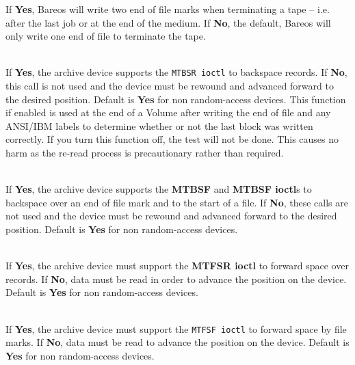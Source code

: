\begin{description}
If {\bf Yes}, Bareos will write two end of file marks when terminating a
tape -- i.e. after the last job or at the end of the medium. If {\bf No},
the default, Bareos will only write one end of file to terminate the tape.

\item [Backward Space Record = {\textless}yes{\textbar}no{\textgreater}] \hfill \\
If {\bf Yes}, the archive device supports the {\tt MTBSR ioctl} to backspace
records. If {\bf No}, this call is not used and the device must be rewound
and advanced forward to the desired position. Default is {\bf Yes} for non
random-access devices. This function if enabled is used at the end of a
Volume after writing the end of file and any ANSI/IBM labels to determine
whether or not the last block was written correctly. If you turn this
function off, the test will not be done. This causes no harm as the re-read
process is precautionary rather than required.

\item [Backward Space File = {\textless}yes{\textbar}no{\textgreater}] \hfill \\
If {\bf Yes}, the archive device supports the {\bf MTBSF} and  {\bf MTBSF
  ioctl}s to backspace over an end of file mark and to the  start of a file. If
  {\bf No}, these calls are not used and the  device must be rewound and
  advanced forward to the desired position.  Default is {\bf Yes} for non
  random-access devices.

\item [Forward Space Record = {\textless}yes{\textbar}no{\textgreater}] \hfill \\
If {\bf Yes}, the archive device must support the {\bf MTFSR  ioctl} to
forward space over records. If {\bf No}, data must  be read in order to
advance the position on the device. Default is  {\bf Yes} for non
random-access devices.

\item [Forward Space File = {\textless}yes{\textbar}no{\textgreater}] \hfill \\
If {\bf Yes}, the archive device must support the {\tt MTFSF  ioctl} to
forward space by file marks. If {\bf No}, data  must be read to advance the
position on the device. Default is  {\bf Yes} for non random-access devices.


\end{description}
